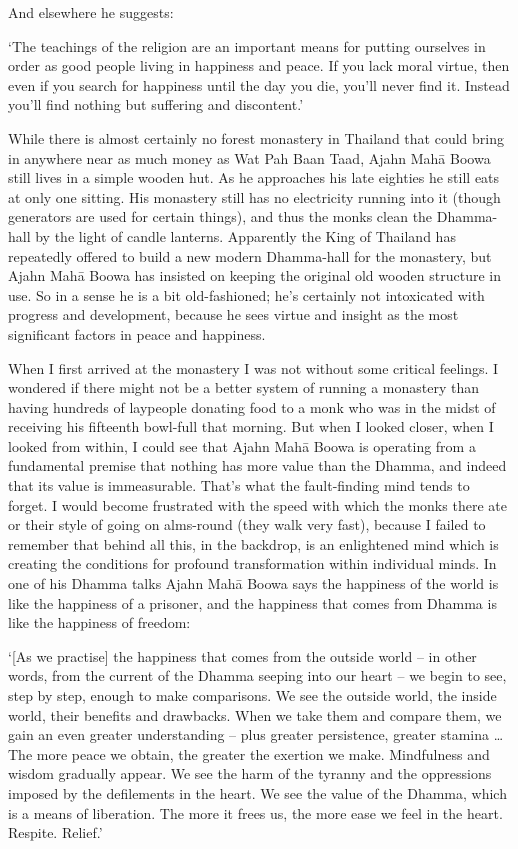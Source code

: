 And elsewhere he suggests:

`The teachings of the religion are an important means for putting
ourselves in order as good people living in happiness and peace. If you
lack moral virtue, then even if you search for happiness until the day
you die, you'll never find it. Instead you'll find nothing but suffering
and discontent.'

While there is almost certainly no forest monastery in Thailand that
could bring in anywhere near as much money as Wat Pah Baan Taad, Ajahn
Mahā Boowa still lives in a simple wooden hut. As he approaches his late
eighties he still eats at only one sitting. His monastery still has no
electricity running into it (though generators are used for certain
things), and thus the monks clean the Dhamma-hall by the light of candle
lanterns. Apparently the King of Thailand has repeatedly offered to
build a new modern Dhamma-hall for the monastery, but Ajahn Mahā Boowa
has insisted on keeping the original old wooden structure in use. So in
a sense he is a bit old-fashioned; he's certainly not intoxicated with
progress and development, because he sees virtue and insight as the most
significant factors in peace and happiness.

When I first arrived at the monastery I was not without some critical
feelings. I wondered if there might not be a better system of running a
monastery than having hundreds of laypeople donating food to a monk who
was in the midst of receiving his fifteenth bowl-full that morning. But
when I looked closer, when I looked from within, I could see that Ajahn
Mahā Boowa is operating from a fundamental premise that nothing has more
value than the Dhamma, and indeed that its value is immeasurable. That's
what the fault-finding mind tends to forget. I would become frustrated
with the speed with which the monks there ate or their style of going on
alms-round (they walk very fast), because I failed to remember that
behind all this, in the backdrop, is an enlightened mind which is
creating the conditions for profound transformation within individual
minds. In one of his Dhamma talks Ajahn Mahā Boowa says the happiness of
the world is like the happiness of a prisoner, and the happiness that
comes from Dhamma is like the happiness of freedom:

`{[}As we practise{]} the happiness that comes from the outside world
-- in other words, from the current of the Dhamma seeping into our
heart -- we begin to see, step by step, enough to make comparisons. We
see the outside world, the inside world, their benefits and drawbacks.
When we take them and compare them, we gain an even greater
understanding -- plus greater persistence, greater stamina \ldots{} The
more peace we obtain, the greater the exertion we make. Mindfulness and
wisdom gradually appear. We see the harm of the tyranny and the
oppressions imposed by the defilements in the heart. We see the value of
the Dhamma, which is a means of liberation. The more it frees us, the
more ease we feel in the heart. Respite. Relief.'


